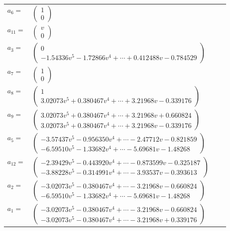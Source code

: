 \documentclass[1p]{elsarticle_modified}
\theoremstyle{definition}
\begin{document}
\begin{tabular}{m{7pt} m{180pt} m{7pt} m{180pt} }
\flushright $a_{6}=$&$\begin{pmatrix}1\\0\end{pmatrix}$ \\
\flushright $a_{11}=$&$\begin{pmatrix}v\\0\end{pmatrix}$ \\
\flushright $a_{3}=$&$\begin{pmatrix}0\\-1.54336 v^{5}-1.72866 v^{4}+\cdots+0.412488 v-0.784529\end{pmatrix}$ \\
\flushright $a_{7}=$&$\begin{pmatrix}1\\0\end{pmatrix}$ \\
\flushright $a_{8}=$&$\begin{pmatrix}1\\3.02073 v^{5}+0.380467 v^{4}+\cdots+3.21968 v-0.339176\end{pmatrix}$ \\
\flushright $a_{9}=$&$\begin{pmatrix}3.02073 v^{5}+0.380467 v^{4}+\cdots+3.21968 v+0.660824\\3.02073 v^{5}+0.380467 v^{4}+\cdots+3.21968 v-0.339176\end{pmatrix}$ \\
\flushright $a_{5}=$&$\begin{pmatrix}-3.57437 v^{5}-0.956350 v^{4}+\cdots-2.47712 v-0.821859\\-6.59510 v^{5}-1.33682 v^{4}+\cdots-5.69681 v-1.48268\end{pmatrix}$ \\
\flushright $a_{12}=$&$\begin{pmatrix}-2.39429 v^{5}-0.443920 v^{4}+\cdots-0.873599 v-0.325187\\-3.88228 v^{5}-0.314991 v^{4}+\cdots-3.93537 v-0.393613\end{pmatrix}$ \\
\flushright $a_{2}=$&$\begin{pmatrix}-3.02073 v^{5}-0.380467 v^{4}+\cdots-3.21968 v-0.660824\\-6.59510 v^{5}-1.33682 v^{4}+\cdots-5.69681 v-1.48268\end{pmatrix}$ \\
\flushright $a_{1}=$&$\begin{pmatrix}-3.02073 v^{5}-0.380467 v^{4}+\cdots-3.21968 v-0.660824\\-3.02073 v^{5}-0.380467 v^{4}+\cdots-3.21968 v+0.339176\end{pmatrix}$ \\

\end{tabular}
\end{document}
